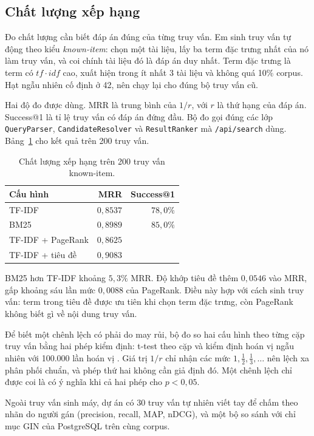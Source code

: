 \documentclass[9pt,twocolumn,a4paper]{extarticle}
\newcommand{\code}[1]{\texttt{#1}}
\begin{document}
\subsection{Chất lượng xếp hạng}
\label{sec:quality}
Đo chất lượng cần biết đáp án đúng của từng truy vấn. Em sinh truy vấn tự động theo kiểu \emph{known-item}: chọn một tài liệu, lấy ba term đặc trưng nhất của nó làm truy vấn, và coi chính tài liệu đó là đáp án duy nhất. Term đặc trưng là term có $tf\cdot idf$ cao, xuất hiện trong ít nhất 3 tài liệu và không quá 10\% corpus. Hạt ngẫu nhiên cố định ở 42, nên chạy lại cho đúng bộ truy vấn cũ.

Hai độ đo được dùng. MRR là trung bình của $1/r$, với $r$ là thứ hạng của đáp án. Success@1 là tỉ lệ truy vấn có đáp án đứng đầu. Bộ đo gọi đúng các lớp \code{QueryParser}, \code{CandidateResolver} và \code{ResultRanker} mà \code{/api/search} dùng. Bảng~\ref{tab:mrr} cho kết quả trên 200 truy vấn.

\begin{table}[H]
\centering
\caption{Chất lượng xếp hạng trên 200 truy vấn known-item.}
\label{tab:mrr}
\footnotesize
\begin{tabular}{@{}lrr@{}}
\toprule
Cấu hình & MRR & Success@1 \\
\midrule
TF-IDF & $0{,}8537$ & $78{,}0\%$ \\
BM25 & $0{,}8989$ & $85{,}0\%$ \\
TF-IDF + PageRank & $0{,}8625$ & \\
TF-IDF + tiêu đề & $0{,}9083$ & \\
\bottomrule
\end{tabular}
\end{table}

BM25 hơn TF-IDF khoảng $5{,}3\%$ MRR. Độ khớp tiêu đề thêm $0{,}0546$ vào MRR, gấp khoảng sáu lần mức $0{,}0088$ của PageRank. Điều này hợp với cách sinh truy vấn: term trong tiêu đề được ưu tiên khi chọn term đặc trưng, còn PageRank không biết gì về nội dung truy vấn.

Để biết một chênh lệch có phải do may rủi, bộ đo so hai cấu hình theo từng cặp truy vấn bằng hai phép kiểm định: t-test theo cặp và kiểm định hoán vị ngẫu nhiên với 100.000 lần hoán vị \cite{smucker2007}. Giá trị $1/r$ chỉ nhận các mức $1,\frac12,\frac13,\dots$ nên lệch xa phân phối chuẩn, và phép thứ hai không cần giả định đó. Một chênh lệch chỉ được coi là có ý nghĩa khi cả hai phép cho $p<0{,}05$.

Ngoài truy vấn sinh máy, dự án có 30 truy vấn tự nhiên viết tay để chấm theo nhãn do người gán (precision, recall, MAP, nDCG), và một bộ so sánh với chỉ mục GIN của PostgreSQL trên cùng corpus.
\end{document}
